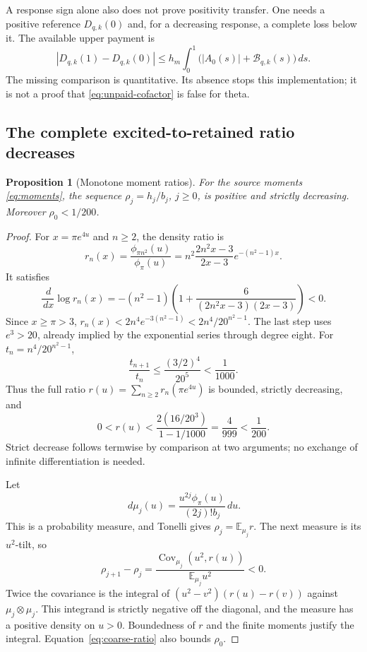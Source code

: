 \documentclass[11pt,letterpaper]{article}
\numberwithin{equation}{section}
\newtheorem{proposition}[theorem]{Proposition}
\theoremstyle{remark}
\DeclareMathOperator{\Cov}{Cov}
\newcommand{\E}{\mathbb E}
\newcommand{\dd}{\,d}
\newcommand{\Bcal}{\mathcal B}
\begin{document}
A response sign alone also does not prove positivity transfer.
One needs a positive reference \(D_{q,k}(0)\) and, for a decreasing
response, a complete loss below it. The available upper payment is
\begin{equation}
 |D_{q,k}(1)-D_{q,k}(0)|
 \le h_m\int_0^1\bigl(|A_0(s)|+\Bcal_{q,k}(s)\bigr)\dd s.
 \label{eq:cofactor-loss}
\end{equation}
The missing comparison is quantitative. Its absence stops this
implementation; it is not a proof that
\eqref{eq:unpaid-cofactor} is false for theta.

\subsection{The complete excited-to-retained ratio decreases}

\begin{proposition}[Monotone moment ratios]\label{prop:ratio}
For the source moments \eqref{eq:moments}, the sequence
\(\rho_j=h_j/b_j\), \(j\ge0\), is positive and strictly decreasing.
Moreover \(\rho_0<1/200\).
\end{proposition}
\begin{proof}
For \(x=\pi e^{4u}\) and \(n\ge2\), the density ratio is
\begin{equation}
 r_n(x)=\frac{\phi_{\pi n^2}(u)}{\phi_\pi(u)}
 =n^2\frac{2n^2x-3}{2x-3}e^{-(n^2-1)x}.
 \label{eq:density-ratio}
\end{equation}
It satisfies
\begin{equation}
 \frac{\dd}{\dd x}\log r_n(x)
 =-(n^2-1)\left(1+\frac6{(2n^2x-3)(2x-3)}\right)<0.
 \label{eq:ratio-slope}
\end{equation}
Since \(x\ge\pi>3\),
\(r_n(x)<2n^4e^{-3(n^2-1)}<2n^4/20^{n^2-1}\).
The last step uses \(e^3>20\), already implied by the exponential
series through degree eight. For \(t_n=n^4/20^{n^2-1}\),
\[
 \frac{t_{n+1}}{t_n}\le\frac{(3/2)^4}{20^5}<\frac1{1000}.
\]
Thus the full ratio \(r(u)=\sum_{n\ge2}r_n(\pi e^{4u})\) is bounded,
strictly decreasing, and
\begin{equation}
 0<r(u)<\frac{2(16/20^3)}{1-1/1000}
 =\frac4{999}<\frac1{200}. \label{eq:coarse-ratio}
\end{equation}
Strict decrease follows termwise by comparison at two arguments;
no exchange of infinite differentiation is needed.

Let
\[
 \dd\mu_j(u)=\frac{u^{2j}\phi_\pi(u)}{(2j)!b_j}\dd u.
\]
This is a probability measure, and Tonelli gives
\(\rho_j=\E_{\mu_j}r\). The next measure is its \(u^2\)-tilt, so
\begin{equation}
 \rho_{j+1}-\rho_j
 =\frac{\Cov_{\mu_j}(u^2,r(u))}{\E_{\mu_j}u^2}<0.
 \label{eq:ratio-covariance}
\end{equation}
Twice the covariance is the integral of
\((u^2-v^2)(r(u)-r(v))\) against \(\mu_j\otimes\mu_j\).
This integrand is strictly negative off the diagonal, and the
measure has a positive density on \(u>0\).
Boundedness of \(r\) and the finite moments justify the integral.
Equation~\eqref{eq:coarse-ratio} also bounds \(\rho_0\).
\end{proof}
\end{document}
